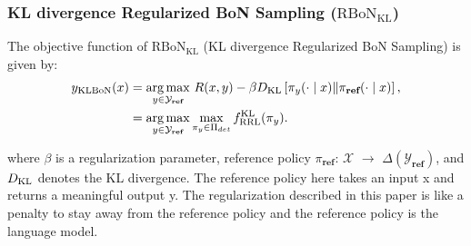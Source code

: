 \subsubsection{KL divergence Regularized BoN Sampling ($\mathrm{RBoN}_{\mathrm{KL}}$)}
\label{pre:rbon}
The objective function of $\mathrm{RBoN}_{\mathrm{KL}}$ (KL divergence Regularized BoN Sampling) is given by:
\begin{equation*}
\begin{aligned}
y_{\mathrm{KLBoN}}(x) &=\operatorname*{arg\,max}_{y \in \mathcal{Y_{\textbf{ref}}}} \, R(x, y)-\beta D_{\mathrm{KL}}\left[\pi_y (\cdot \mid x) \| \pi_{\textbf{ref}}(\cdot \mid x)\right],\\
&= \underset{y \in \mathcal{Y}_{\textbf{ref}}}{\operatorname*{arg\,max}}\max_{\pi_y \in \Pi_{det}} f_\mathrm{RRL}^{\mathrm{KL}}(\pi_y).
\end{aligned}
\end{equation*}


where $\beta$ is a regularization parameter, reference policy $\pi_{\textbf{ref}}$: $\mathcal{X}$ $\rightarrow$ $\Delta(\mathcal{Y}_{\textbf{ref}})$, and $D_{\mathrm{KL}}$ denotes the KL divergence. The reference policy here takes an input x and returns a meaningful output y. The regularization described in this paper is like a penalty to stay away from the reference policy and the reference policy is the language model.

